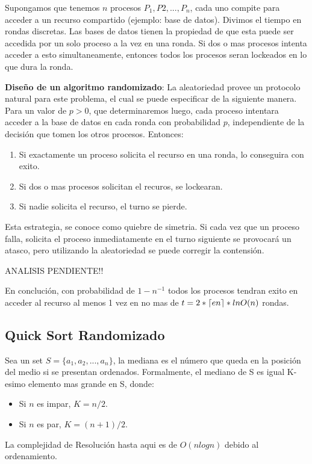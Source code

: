 \documentclass{article}
\DeclarePairedDelimiter{\ceil}{\lceil}{\rceil}
\begin{document}
Supongamos que tenemos \(n\) procesos \(P_1, P2,...,P_n\), cada uno compite para acceder a un 
recurso compartido (ejemplo: base de datos). Divimos el tiempo en rondas discretas. 
Las bases de datos tienen la propiedad de que esta puede ser accedida por un solo proceso a la vez
en una ronda. Si dos o mas procesos intenta acceder a esto simultaneamente, entonces todos los procesos
seran lockeados en lo que dura la ronda. 

\textbf{Diseño de un algoritmo randomizado}: La aleatoriedad provee un protocolo natural para este 
problema, el cual se puede especificar de la siguiente manera. Para un valor de \(p > 0\), que determinaremos
luego, cada proceso intentara acceder a la base de datos en cada ronda con probabilidad \(p\),
independiente de la decisión que tomen los otros procesos. Entonces:

\begin{enumerate}
    \item Si exactamente un proceso solicita el recurso en una ronda, lo conseguira con exito.
    \item Si dos o mas procesos solicitan el recuros, se lockearan.
    \item Si nadie solicita el recurso, el turno se pierde.
\end{enumerate}

Esta estrategia, se conoce como quiebre de simetria. Si cada vez que un proceso falla,
solicita el proceso inmediatamente en el turno siguiente se provocará un atasco, pero 
utilizando la aleatoriedad se puede corregir la contensión.


ANALISIS PENDIENTE!!


En conclución, con probabilidad de \(1-n^{-1}\) todos los procesos tendran exito en 
acceder al recurso al menos 1 vez en no mas de \(t=2*\ceil{en}*lnO(n)\) rondas.


\newpage
\subsection{Quick Sort Randomizado}

Sea un set \(S=\{a_1, a_2,...,a_n\}\), la mediana es el número que queda en la posición del medio si
se presentan ordenados. Formalmente, el mediano de S es igual K-esimo elemento mas grande en S, donde:

\begin{itemize}
    \item Si \(n\) es impar, \(K=n/2\).
    \item Si \(n\) es par, \(K=(n+1)/2\).
\end{itemize}
La complejidad de Resolución hasta aqui es de \(O(n log n)\) debido al ordenamiento.
\end{document}
